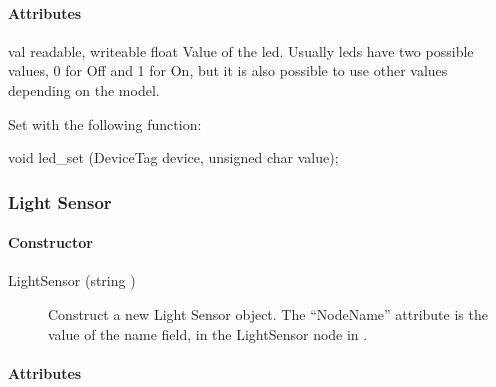 \paragraph{Attributes}

\noindent
\begin{itemize}
\begin{attribute}{val}
  {readable, writeable}
  {float}
  {}
  Value of the led. Usually leds have two possible values,
  0 for Off and 1 for On, but it is also possible to use other values
  depending on the \webots model.

  Set with the following \webots function:
\begin{cxx}
void led_set (DeviceTag device, unsigned char value);
\end{cxx}
\end{attribute}

\end{itemize}

\subsubsection{Light Sensor}

\paragraph{Constructor}

\noindent
\begin{description}
\item[{LightSensor (string )}] Construct a new Light
  Sensor object. The ``NodeName'' attribute is the value of the name
  field, in the LightSensor node in \webots.

\end{description}

\paragraph{Attributes}

